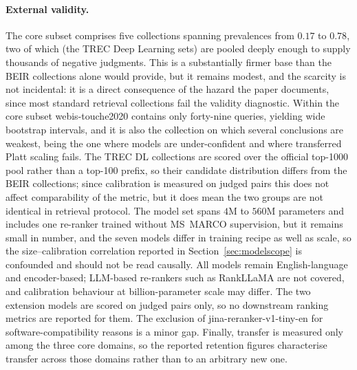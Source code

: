 \documentclass[sn-mathphys-num,pdflatex]{sn-jnl}
\begin{document}
\paragraph{External validity.}
The core subset comprises five collections spanning prevalences from $0.17$ to
$0.78$, two of which (the TREC Deep Learning sets) are pooled deeply enough to
supply thousands of negative judgments. This is a substantially firmer base than the
BEIR collections alone would provide, but it remains modest, and the scarcity is not
incidental: it is a direct consequence of the hazard the paper documents, since most
standard retrieval collections fail the validity diagnostic. Within the core subset
webis-touche2020 contains only forty-nine queries, yielding wide bootstrap intervals,
and it is also the collection on which several conclusions are weakest, being the one
where models are under-confident and where transferred Platt scaling fails. The TREC
DL collections are scored over the official top-1000 pool rather than a top-100
prefix, so their candidate distribution differs from the BEIR collections; since
calibration is measured on judged pairs this does not affect comparability of the
metric, but it does mean the two groups are not identical in retrieval protocol. The model set spans $4$M to $560$M parameters and includes one re-ranker trained
without MS~MARCO supervision, but it remains small in number, and the seven models
differ in training recipe as well as scale, so the size--calibration correlation
reported in Section~\ref{sec:modelscope} is confounded and should not be read
causally. All models remain English-language and encoder-based; LLM-based
re-rankers such as RankLLaMA \cite{ma2024rankllama} are not covered, and
calibration behaviour at billion-parameter scale may differ. The two extension
models are scored on judged pairs only, so no downstream ranking metrics are
reported for them. The exclusion of
jina-reranker-v1-tiny-en for software-compatibility reasons is a minor gap. Finally,
transfer is measured only among the three core domains, so the reported retention
figures characterise transfer across those domains rather than to an arbitrary new
one.
\end{document}

